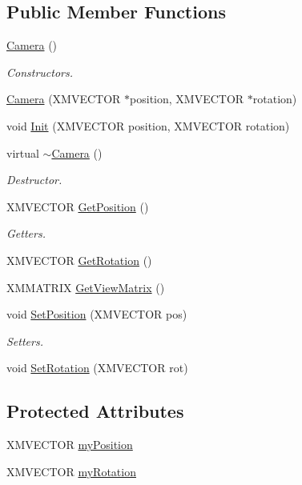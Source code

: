 \subsection*{Public Member Functions}
\begin{DoxyCompactItemize}
\item 
\hyperlink{class_camera_a01f94c3543f56ede7af49dc778f19331}{Camera} ()
\begin{DoxyCompactList}\small\item\em Constructors. \end{DoxyCompactList}\item 
\hyperlink{class_camera_a029be94b2307a3ffeb0de58769dc6d6e}{Camera} (X\+M\+V\+E\+C\+T\+OR $\ast$position, X\+M\+V\+E\+C\+T\+OR $\ast$rotation)
\item 
void \hyperlink{class_camera_a2cb449dfd69fc002ab6117d71c6af1ff}{Init} (X\+M\+V\+E\+C\+T\+OR position, X\+M\+V\+E\+C\+T\+OR rotation)
\item 
virtual \hyperlink{class_camera_ad1897942d0ccf91052386388a497349f}{$\sim$\+Camera} ()
\begin{DoxyCompactList}\small\item\em Destructor. \end{DoxyCompactList}\item 
X\+M\+V\+E\+C\+T\+OR \hyperlink{class_camera_a0ba4b24f3f39dedb32715dc787d1a75d}{Get\+Position} ()
\begin{DoxyCompactList}\small\item\em Getters. \end{DoxyCompactList}\item 
X\+M\+V\+E\+C\+T\+OR \hyperlink{class_camera_a374cad6c4aef593974bc96d5186dbcb2}{Get\+Rotation} ()
\item 
X\+M\+M\+A\+T\+R\+IX \hyperlink{class_camera_a2e6a80af72c230fafd8f5ec9f32db15b}{Get\+View\+Matrix} ()
\item 
void \hyperlink{class_camera_a6cdb52b1f4b0ebc7b2f581a02a761e10}{Set\+Position} (X\+M\+V\+E\+C\+T\+OR pos)
\begin{DoxyCompactList}\small\item\em Setters. \end{DoxyCompactList}\item 
void \hyperlink{class_camera_a66bf632272852abc17b5dc15cceb3591}{Set\+Rotation} (X\+M\+V\+E\+C\+T\+OR rot)
\end{DoxyCompactItemize}
\subsection*{Protected Attributes}
\begin{DoxyCompactItemize}
\item 
X\+M\+V\+E\+C\+T\+OR \hyperlink{class_camera_ae90a13af9d2b2f18b19e430a3b301ae9}{my\+Position}
\item 
X\+M\+V\+E\+C\+T\+OR \hyperlink{class_camera_a922f81f1d51693f48310a49d94c9a66e}{my\+Rotation}
\end{DoxyCompactItemize}
